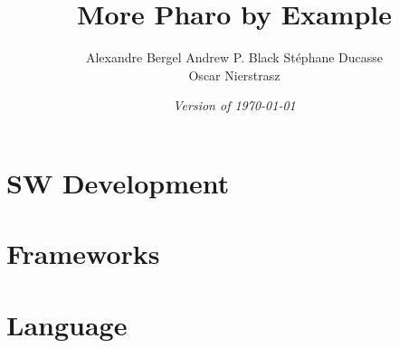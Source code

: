 \documentclass[a4paper,10pt,twoside]{book}
\begin{document}
\frontmatter
\setcounter{page}{1}
\pagestyle{headings}
\author{
	Alexandre Bergel\quad
	Andrew P. Black\quad
	St\'ephane Ducasse\\[1ex]
	Oscar Nierstrasz\quad}
\title{\Huge\bf More Pharo by Example\\[1ex]}
\isodate
\date{\emph{Version of \today}}
\maketitle
\tableofcontents
\sloppy %
\mainmatter

\part{SW Development}

% 
% 
% 

\part{Frameworks}

% 



\part{Language}








\printindex
\end{document}
